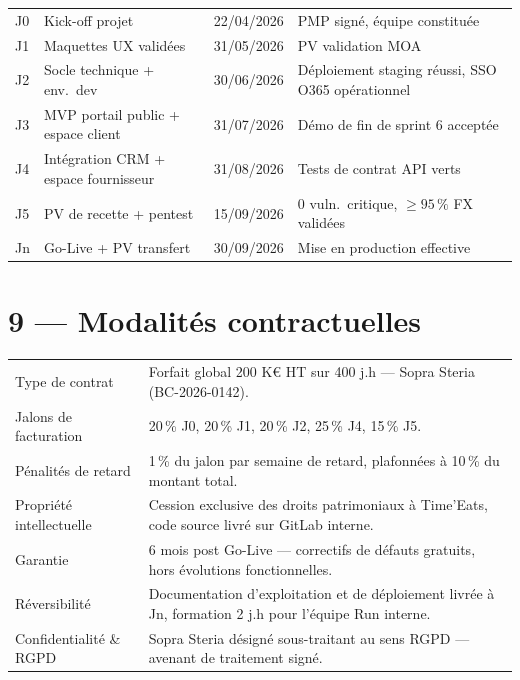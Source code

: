 \documentclass[11pt,a4paper,oneside]{report}
\begin{document}
\renewcommand{\arraystretch}{1.3}
\begin{tabularx}{\textwidth}{C{1cm} L{4.5cm} C{2.5cm} Y}
\toprule
{} &  &  &  \\
\midrule
J0 & Kick-off projet              & 22/04/2026 & PMP signé, équipe constituée \\
J1 & Maquettes UX validées        & 31/05/2026 & PV validation MOA \\
J2 & Socle technique + env.\ dev  & 30/06/2026 & Déploiement staging réussi, SSO O365 opérationnel \\
J3 & MVP portail public + espace client & 31/07/2026 & Démo de fin de sprint 6 acceptée \\
J4 & Intégration CRM + espace fournisseur & 31/08/2026 & Tests de contrat API verts \\
J5 & PV de recette + pentest      & 15/09/2026 & 0 vuln.\ critique, $\geq 95\,\%$ FX validées \\
Jn & Go-Live + PV transfert       & 30/09/2026 & Mise en production effective \\
\bottomrule
\end{tabularx}

\section*{9 --- Modalités contractuelles}

\renewcommand{\arraystretch}{1.3}
\begin{tabularx}{\textwidth}{L{4cm} Y}
\toprule
{} &  \\
\midrule
Type de contrat         & Forfait global 200 K€ HT sur 400 j.h --- Sopra Steria (BC-2026-0142). \\
Jalons de facturation   & 20\,\% J0, 20\,\% J1, 20\,\% J2, 25\,\% J4, 15\,\% J5. \\
Pénalités de retard     & 1\,\% du jalon par semaine de retard, plafonnées à 10\,\% du montant total. \\
Propriété intellectuelle & Cession exclusive des droits patrimoniaux à Time'Eats, code source livré sur GitLab interne. \\
Garantie                & 6 mois post Go-Live --- correctifs de défauts gratuits, hors évolutions fonctionnelles. \\
Réversibilité           & Documentation d'exploitation et de déploiement livrée à Jn, formation 2 j.h pour l'équipe Run interne. \\
Confidentialité \& RGPD & Sopra Steria désigné sous-traitant au sens RGPD --- avenant de traitement signé. \\
\bottomrule
\end{tabularx}
\end{document}

